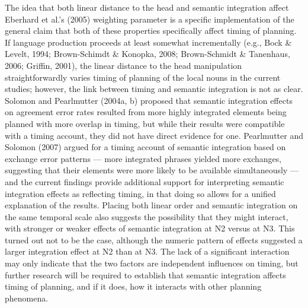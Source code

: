 \documentclass[12pt,titlepage]{article}
\newcommand{\TODO}[1]{\textbf{*** #1 ***}}  %
\newcommand{\IGNORE}[1]{} %
\begin{document}
\IGNORE{\TODO{the following para doesn't quite work --- not clear there's a
concern about the *design*; the issue is about the link between semint and
timing (and thus scope effects) --- so it's not a problem/concern, it's
stuff we don't yet know (and should perhaps go later in the GD); think we
want to claim that if semint affects timing, then it makes sense that both
linear order and semint should play into scope; the independence issue is
separate -- lack of a statistical interaction in HP2 doesn't speak directly
to this\ldots\ i.e., linear order and semint might just have independent
effects on timing; discussion of facts of non-interaction at end of para
also needs a little clarification} --- think this version works OK:}

The idea that both linear distance to the head and semantic integration
affect Eberhard et al.'s (2005) weighting parameter is a specific
implementation of the general claim that both of these properties
specifically affect timing of planning.  If language production proceeds at
least somewhat incrementally (e.g., Bock \& Levelt, 1994; Brown-Schimdt \&
Konopka, 2008; Brown-Schmidt \& Tanenhaus, 2006; Griffin, 2001), the linear
distance to the head manipulation straightforwardly varies timing of
planning of the local nouns in the current studies; however, the link
between timing and semantic integration is not as clear.  Solomon and
Pearlmutter (2004a, b) proposed that semantic integration effects on
agreement error rates resulted from more highly integrated elements being
planned with more overlap in timing, but while their results were
compatible with a timing account, they did not have direct evidence for
one.  Pearlmutter and Solomon (2007) argued for a timing account of
semantic integration based on exchange error patterns --- more integrated
phrases yielded more exchanges, suggesting that their elements were more
likely to be available simultaneously --- and the current findings provide
additional support for interpreting semantic integration effects as
reflecting timing, in that doing so allows for a unified explanation of the
results.  Placing both linear order and semantic integration on the same
temporal scale also suggests the possibility that they might interact, with
stronger or weaker effects of semantic integration at N2 versus at N3.
This turned out not to be the case, although the numeric pattern of effects
suggested a larger integration effect at N2 than at N3.  The lack of a
significant interaction may only indicate that the two factors are
independent influences on timing, but further research will be required to
establish that semantic integration affects timing of planning, and if it
does, how it interacts with other planning phenomena.
\end{document}
